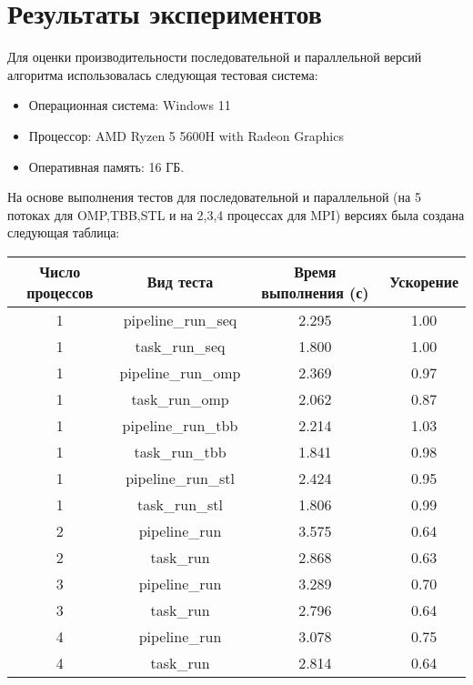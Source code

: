 \documentclass[a4paper,12pt]{article}
\begin{document}
\section{Результаты экспериментов}
Для оценки производительности последовательной и параллельной версий алгоритма использовалась следующая тестовая система:
\begin{itemize}
    \item Операционная система: Windows 11
    \item Процессор: AMD Ryzen 5 5600H with Radeon Graphics
    \item Оперативная память: 16 ГБ.
\end{itemize}
На основе выполнения тестов для последовательной и параллельной (на 5 потоках для OMP,TBB,STL и на 2,3,4 процессах для MPI) версиях была создана следующая таблица:\\[0,5cm]
\begin{tabular}{|c|c|c|c|}
    \hline
    Число процессов & Вид теста      & Время выполнения (с) & Ускорение \\ \hline
    1               & pipeline\_run\_seq & 2.295                & 1.00      \\ \hline
    1               & task\_run\_seq     & 1.800                & 1.00      \\ \hline
    1               & pipeline\_run\_omp & 2.369                & 0.97      \\ \hline
    1               & task\_run\_omp     & 2.062                & 0.87      \\ \hline
    1               & pipeline\_run\_tbb & 2.214                & 1.03      \\ \hline
    1               & task\_run\_tbb     & 1.841                & 0.98      \\ \hline
    1               & pipeline\_run\_stl & 2.424                & 0.95      \\ \hline
    1               & task\_run\_stl     & 1.806                & 0.99      \\ \hline
    2               & pipeline\_run & 3.575                & 0.64      \\ \hline
    2               & task\_run     & 2.868                & 0.63      \\ \hline
    3               & pipeline\_run & 3.289                & 0.70      \\ \hline
    3               & task\_run     & 2.796                & 0.64      \\ \hline
    4               & pipeline\_run & 3.078                & 0.75      \\ \hline
    4               & task\_run     & 2.814                & 0.64      \\ \hline
\end{tabular}
\newpage
\end{document}
